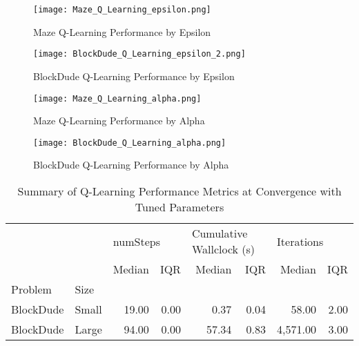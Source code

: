 \documentclass{article}
\begin{document}
\begin{figure}
    \centering
    \begin{minipage}{0.5\textwidth}
        \centering
        \texttt{[image: Maze\_Q\_Learning\_epsilon.png]}
        \caption{Maze Q-Learning Performance by Epsilon}
        \label{fig:small-maze-pi}
    \end{minipage}\hfill
    \begin{minipage}{0.5\textwidth}
        \centering
        \texttt{[image: BlockDude\_Q\_Learning\_epsilon\_2.png]}
        \caption{BlockDude Q-Learning Performance by Epsilon}
        \label{fig:large-maze-pi}
    \end{minipage}
\end{figure}

\begin{figure}
    \centering
    \begin{minipage}{0.5\textwidth}
        \centering
        \texttt{[image: Maze\_Q\_Learning\_alpha.png]}
        \caption{Maze Q-Learning Performance by Alpha}
        \label{fig:small-maze-pi}
    \end{minipage}\hfill
    \begin{minipage}{0.5\textwidth}
        \centering
        \texttt{[image: BlockDude\_Q\_Learning\_alpha.png]}
        \caption{BlockDude Q-Learning Performance by Alpha}
        \label{fig:large-maze-pi}
    \end{minipage}
\end{figure}

\begin{table}
    \centering
    \caption{Summary of Q-Learning Performance Metrics at Convergence with Tuned Parameters}
    \label{table:large-bd-ql}
    \begin{tabular}{llrrrrrr}
        \toprule
           &     & \multicolumn{2}{l}{numSteps} & \multicolumn{2}{l}{Cumulative Wallclock (s)} & \multicolumn{2}{l}{Iterations} \\
           &     &   Median &  IQR &           Median &    IQR &    Median &   IQR \\
        Problem & Size &          &      &                  &        &           &       \\
        \midrule
        BlockDude & Small &    19.00 & 0.00 &         0.37 &  0.04  &     58.00 &  2.00 \\
        BlockDude & Large &    94.00 & 0.00 &         57.34 &  0.83 &  4,571.00 &  3.00 \\
        \bottomrule
        \end{tabular}               
    \end{table} 
    


    {}

\end{document}
